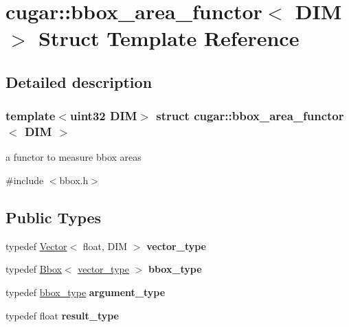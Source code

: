 \hypertarget{structcugar_1_1bbox__area__functor}{}\section{cugar\+:\+:bbox\+\_\+area\+\_\+functor$<$ D\+IM $>$ Struct Template Reference}
\label{structcugar_1_1bbox__area__functor}


\subsection{Detailed description}
\subsubsection*{template$<$uint32 D\+IM$>$\newline
struct cugar\+::bbox\+\_\+area\+\_\+functor$<$ D\+I\+M $>$}

a functor to measure bbox areas 

{\ttfamily \#include $<$bbox.\+h$>$}

\subsection*{Public Types}
\begin{DoxyCompactItemize}
\item 
\mbox{\label{structcugar_1_1bbox__area__functor_abadda3e6f17e87ea1a0e6c083a0e104f}} 
typedef \hyperlink{structcugar_1_1_vector}{Vector}$<$ float, D\+IM $>$ {\bfseries vector\+\_\+type}
\item 
\mbox{\label{structcugar_1_1bbox__area__functor_ae6ed2eb1cc1e1b2d97c7aed019cf5522}} 
typedef \hyperlink{structcugar_1_1_bbox}{Bbox}$<$ \hyperlink{structcugar_1_1_vector}{vector\+\_\+type} $>$ {\bfseries bbox\+\_\+type}
\item 
\mbox{\label{structcugar_1_1bbox__area__functor_a7f198164fb05a2b7e65d16b183817df0}} 
typedef \hyperlink{structcugar_1_1_bbox}{bbox\+\_\+type} {\bfseries argument\+\_\+type}
\item 
\mbox{\label{structcugar_1_1bbox__area__functor_ae7def053707f87e402febd2f13f63e11}} 
typedef float {\bfseries result\+\_\+type}
\end{DoxyCompactItemize}
